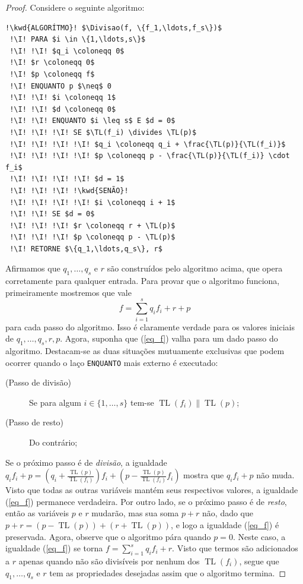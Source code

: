 \documentclass[12pt,a4paper]{report}
\newcommand{\kwd}[1]{\texttt{\textcolor{keyword}{#1}}}
\newcommand{\I}{\enspace\textcolor{indent}\vrule\hspace{2pt}}
\newcommand{\divides}{\parallel}
\numberwithin{theorem}{chapter}
\DeclareMathOperator{\TL}{TL}
\DeclareMathOperator{\Divisao}{Divis\tilde{a}o}
\begin{document}
\begin{proof} Considere o seguinte algoritmo:

\begin{lstlisting}[language=algorithm]
 !\kwd{ALGORÍTMO}! $\Divisao(f, \{f_1,\ldots,f_s\})$
 !\I! PARA $i \in \{1,\ldots,s\}$
 !\I! !\I! $q_i \coloneqq 0$
 !\I! $r \coloneqq 0$
 !\I! $p \coloneqq f$
 !\I! ENQUANTO p $\neq$ 0
 !\I! !\I! $i \coloneqq 1$
 !\I! !\I! $d \coloneqq 0$
 !\I! !\I! ENQUANTO $i \leq s$ E $d = 0$
 !\I! !\I! !\I! SE $\TL(f_i) \divides \TL(p)$
 !\I! !\I! !\I! !\I! $q_i \coloneqq q_i + \frac{\TL(p)}{\TL(f_i)}$
 !\I! !\I! !\I! !\I! $p \coloneqq p - \frac{\TL(p)}{\TL(f_i)} \cdot f_i$
 !\I! !\I! !\I! !\I! $d = 1$
 !\I! !\I! !\I! !\kwd{SENÃO}!
 !\I! !\I! !\I! !\I! $i \coloneqq i + 1$
 !\I! !\I! SE $d = 0$
 !\I! !\I! !\I! $r \coloneqq r + \TL(p)$
 !\I! !\I! !\I! $p \coloneqq p - \TL(p)$
 !\I! RETORNE $\{q_1,\ldots,q_s\}, r$
\end{lstlisting}

Afirmamos que \(q_1,\ldots,q_s\) e \(r\) são construídos pelo
algoritmo acima, que opera corretamente para qualquer entrada.  Para
provar que o algoritmo funciona, primeiramente mostremos que vale
\begin{equation}\label{eq_f}
  f = \sum\limits_{i=1}^{s}{q_if_i}+r+p
\end{equation}
para cada passo do algoritmo.  Isso é claramente verdade para os
valores iniciais de \(q_1,\ldots,q_s,r,p\).  Agora, suponha que
(\ref{eq_f}) valha para um dado passo do algoritmo.  Destacam-se as
duas situações mutuamente exclusivas que podem ocorrer quando o laço
\kwd{ENQUANTO} mais externo é executado:

\begin{description}
\item[(Passo de divisão)] Se para algum \(i \in \{1,\ldots,s\}\)
  tem-se \(\TL(f_i) \divides \TL(p)\);
\item[(Passo de resto)] Do contrário;
\end{description}

Se o próximo passo é de \textit{divisão}, a igualdade \(q_if_i + p =
\left(q_i + \frac{\TL(p)}{\TL(f_i)}\right)f_i + \left(p -
  \frac{\TL(p)}{\TL(f_i)}f_i\right)\) mostra que \(q_if_i+p\) não
muda.  Visto que todas as outras variáveis mantém seus respectivos
valores, a igualdade (\ref{eq_f}) permanece verdadeira.  Por outro
lado, se o próximo passo é de \textit{resto}, então as variáveis \(p\)
e \(r\) mudarão, mas sua soma \(p + r\) não, dado que \(p + r = (p -
\TL(p)) + (r + \TL(p))\), e logo a igualdade (\ref{eq_f}) é
preservada.  Agora, observe que o algoritmo pára quando \(p = 0\).
Neste caso, a igualdade (\ref{eq_f}) se torna \(f =
\sum\limits_{i=1}^{s}{q_if_i}+r\).  Visto que termos são adicionados a
\(r\) apenas quando não são divisíveis por nenhum dos \(\TL(f_i)\),
segue que \(q_1,\ldots,q_s\) e \(r\) tem as propriedades desejadas
assim que o algoritmo termina.


\end{proof}
\end{document}
